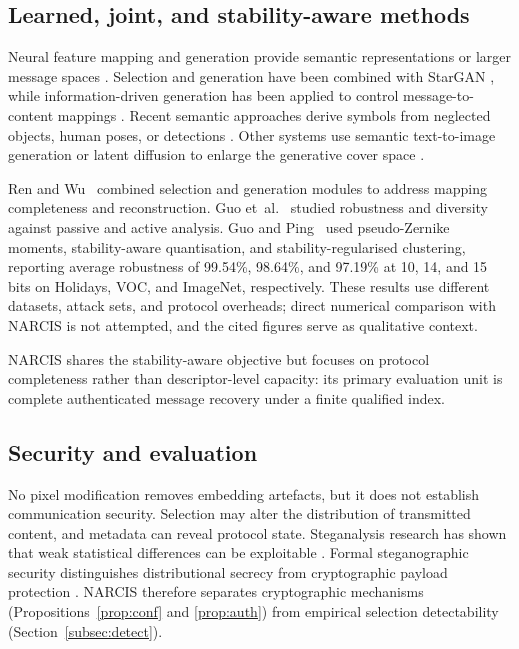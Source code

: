 ﻿\documentclass[10pt,journal]{IEEEtran}
\newcommand{\method}{NARCIS\xspace}
\begin{document}
\subsection{Learned, joint, and stability-aware methods}

Neural feature mapping and generation provide semantic representations
or larger message spaces \cite{qin2020gan,meng2024review}. Selection
and generation have been combined with StarGAN \cite{chen2022stargan},
while information-driven generation has been applied to control
message-to-content mappings \cite{zhang2023idgan}. Recent semantic
approaches derive symbols from neglected objects, human poses, or
detections \cite{zou2023neglected,tan2024pose,meng2024object}. Other
systems use semantic text-to-image generation or latent diffusion to
enlarge the generative cover space \cite{li2025semantic,guo2026diffusion}.

Ren and Wu~\cite{ren2024joint} combined selection and generation modules
to address mapping completeness and reconstruction. Guo
et~al.~\cite{guo2025diverse} studied robustness and diversity against
passive and active analysis. Guo and Ping~\cite{guo2026capacity} used
pseudo-Zernike moments, stability-aware quantisation, and
stability-regularised clustering, reporting average robustness of
99.54\%, 98.64\%, and 97.19\% at 10, 14, and 15 bits on Holidays,
VOC, and ImageNet, respectively. These results use different datasets,
attack sets, and protocol overheads; direct numerical comparison
with \method is not attempted, and the cited figures serve as
qualitative context.

\method shares the stability-aware objective but focuses on protocol
completeness rather than descriptor-level capacity: its primary
evaluation unit is complete authenticated message recovery under a
finite qualified index.

\subsection{Security and evaluation}

No pixel modification removes embedding artefacts, but it does not
establish communication security. Selection may alter the distribution
of transmitted content, and metadata can reveal protocol state.
Steganalysis research has shown that weak statistical differences can
be exploitable \cite{fridrich2012rich,holub2014uniward,
xu2016steganalysis,ye2017steganalysis,yedroudj2018net,
boroumand2018srnet}. Formal steganographic security distinguishes
distributional secrecy from cryptographic payload protection
\cite{cachin1998steganography}. \method therefore separates
cryptographic mechanisms (Propositions~\ref{prop:conf} and
\ref{prop:auth}) from empirical selection detectability
(Section~\ref{subsec:detect}).
\end{document}
